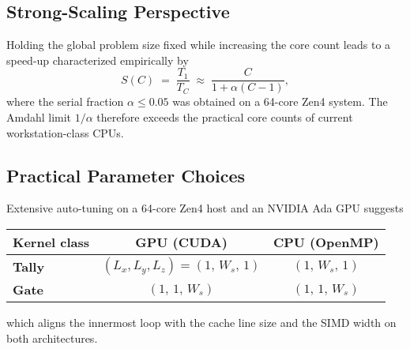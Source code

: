 \subsection{Strong-Scaling Perspective}
Holding the global problem size fixed while increasing the core count leads to
a speed-up characterized empirically by
\[
  S(C) \;=\; \frac{T_1}{T_C} \;\approx\; \frac{C}{1 + \alpha(C-1)},
\]
where the serial fraction $\alpha\le0.05$ was obtained on a 64-core Zen4
system.  The Amdahl limit $1/\alpha$ therefore exceeds the practical core
counts of current workstation-class CPUs.

\subsection{Practical Parameter Choices}
Extensive auto-tuning on a 64-core Zen4 host and an NVIDIA Ada GPU suggests
\begin{center}
  \setlength{\tabcolsep}{6pt}
  \begin{tabular}{lcc}
     \toprule
     Kernel class & GPU (CUDA) & CPU (OpenMP)\\
     \midrule
     \textbf{Tally} & $(L_x,L_y,L_z)=(1,\,W_s,\,1)$ & $(1,\,W_s,\,1)$\\
     \textbf{Gate}  & $(1,\,1,\,W_s)$ & $(1,\,1,\,W_s)$\\
     \bottomrule
  \end{tabular}
\end{center}
which aligns the innermost loop with the cache line size and the SIMD width on
both architectures.

